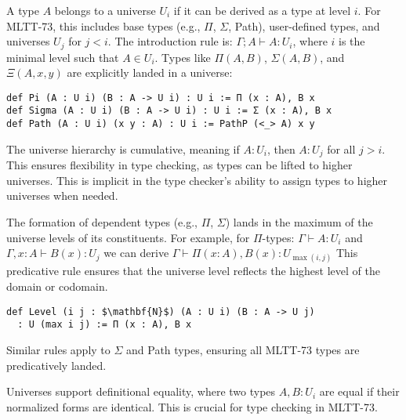 \documentclass{article}
\begin{document}
\begin{definition}
A type \( A \) belongs to a universe \( U_i \) if it can be derived as a type at
level \( i \). For MLTT-73, this includes base types (e.g., \( \Pi \), \( \Sigma \), Path),
user-defined types, and universes \( U_j \) for \( j < i \). The introduction rule is:
$\Gamma ; A \vdash A : U_i$, where $i$ is the minimal level such that $A \in U_i$.
Types like \( \Pi(A, B) \), \( \Sigma(A, B) \), and \( \Xi(A, x, y) \) are
explicitly landed in a universe:
\begin{lstlisting}[mathescape=true]
def Pi (A : U i) (B : A -> U i) : U i := Π (x : A), B x
def Sigma (A : U i) (B : A -> U i) : U i := Σ (x : A), B x
def Path (A : U i) (x y : A) : U i := PathP (<_> A) x y
\end{lstlisting}
\end{definition}

\begin{definition}
The universe hierarchy is cumulative, meaning
if \( A : U_i \), then \( A : U_j \) for all \( j > i \).
This ensures flexibility in type checking, as types can be lifted to higher universes.
This is implicit in the type checker’s ability
to assign types to higher universes when needed.
\end{definition}

\begin{definition}
The formation of dependent types (e.g., \( \Pi \), \( \Sigma \)) lands
in the maximum of the universe levels of its constituents. For example,
for \( \Pi \)-types: $\Gamma \vdash A : U_i$ and $\Gamma, x : A \vdash B(x) : U_j$ we
can derive $\Gamma \vdash \Pi (x : A), B(x) : U_{\max(i, j)}$
This predicative rule ensures that the universe level reflects
the highest level of the domain or codomain.
\begin{lstlisting}[mathescape=true]
def Level (i j : $\mathbf{N}$) (A : U i) (B : A -> U j)
  : U (max i j) := Π (x : A), B x
\end{lstlisting}
Similar rules apply to \( \Sigma \) and Path types,
ensuring all MLTT-73 types are predicatively landed.
\end{definition}

\begin{definition}
Universes support definitional equality, where two types \( A, B : U_i \)
are equal if their normalized forms are identical.
This is crucial for type checking in MLTT-73.
\end{definition}
\end{document}
